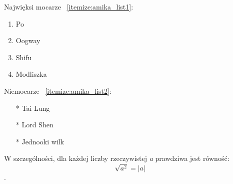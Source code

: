 Najwięksi mocarze ~\ref{itemize:amika_list1}:
\begin{enumerate}
  \item Po
  \item Oogway
  \item Shifu
  \item Modliszka
  \label{itemize:amika_list1}
\end{enumerate}

\bigskip

Niemocarze ~\ref{itemize:amika_list2}:
\begin{itemize}
  \item[*] Tai Lung
  \item[*] Lord Shen
  \item[*] Jednooki wilk
  \label{itemize:amika_list2}
\end{itemize}



W szczególności, dla każdej liczby rzeczywistej {\it a} prawdziwa jest równość:
 \[\sqrt{a^2} = |a|\].